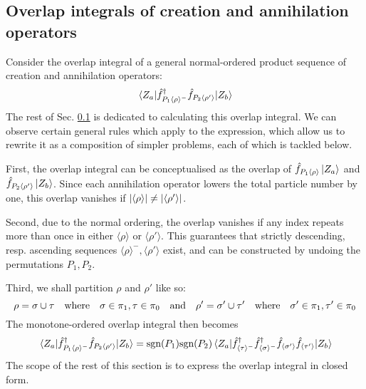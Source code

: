 \documentclass[12pt]{article}
\newcommand{\sgn}{\text{sgn}}
\newcommand{\seq}[1]{\langle #1\rangle}
\newcommand{\hc}{^\dagger}
\begin{document}
	\subsection{Overlap integrals of creation and annihilation operators} \label{sec:reduced overlaps}
	
	Consider the overlap integral of a general normal-ordered product sequence of creation and annihilation operators:
	\begin{equation}
	\mel{Z_a}{\hat{f}\hc_{P_1\seq{\rho}^-}\hat{f}_{P_2\seq{\rho'}}}{Z_b}
	\end{equation}
	The rest of Sec. \ref{sec:reduced overlaps} is dedicated to calculating this overlap integral. We can observe certain general rules which apply to the expression, which allow us to rewrite it as a composition of simpler problems, each of which is tackled below.
	
	First, the overlap integral can be conceptualised as the overlap of $\hat{f}_{P_1\seq{\rho}}\ket{Z_a}$ and $\hat{f}_{P_2\seq{\rho'}}\ket{Z_b}$. Since each annihilation operator lowers the total particle number by one, this overlap vanishes if $\abs{\seq{\rho}}\neq\abs{\seq{\rho'}}$.
	
	Second, due to the normal ordering, the overlap vanishes if any index repeats more than once in either $\seq{\rho}$ or $\seq{\rho'}$. This guarantees that strictly descending, resp. ascending sequences $\seq{\rho}^-,\seq{\rho'}$ exist, and can be constructed by undoing the permutations $P_1,P_2$.
	
	Third, we shall partition $\rho$ and $\rho'$ like so:
	\begin{equation}
	\rho = \sigma \cup \tau\qq{where}\sigma\in\pi_1,\tau\in\pi_0\qq{and}\rho' = \sigma' \cup \tau'\qq{where}\sigma'\in\pi_1,\tau'\in\pi_0
	\end{equation}
	The monotone-ordered overlap integral then becomes
	\begin{equation}
	\mel{Z_a}{\hat{f}\hc_{P_1\seq{\rho}^-}\hat{f}_{P_2\seq{\rho'}}}{Z_b}=\sgn(P_1)\sgn(P_2)\mel{Z_a}{\hat{f}\hc_{\seq{\tau}^-}\hat{f}\hc_{\seq{\sigma}^-}\hat{f}_{\seq{\sigma'}}\hat{f}_{\seq{\tau'}}}{Z_b}
	\end{equation}
	The scope of the rest of this section is to express the overlap integral in closed form.
	
\end{document}
